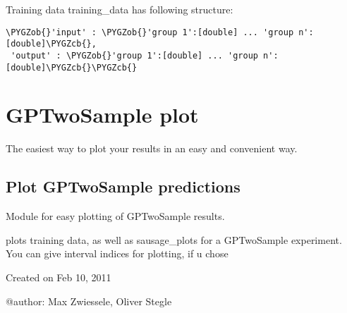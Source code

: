 \documentclass[letterpaper,10pt]{sphinxmanual}
\def\PYGZob{\char`\{}
\def\PYGZcb{\char`\}}
\begin{document}
\begin{fulllineitems}
\begin{fulllineitems}
\begin{description}
Training data training\_data has following structure:

\begin{Verbatim}[commandchars=\\\{\}]
\PYGZob{}'input' : \PYGZob{}'group 1':[double] ... 'group n':[double]\PYGZcb{},
 'output' : \PYGZob{}'group 1':[double] ... 'group n':[double]\PYGZcb{}\PYGZcb{}
\end{Verbatim}

\end{description}

\end{fulllineitems}


\end{fulllineitems}

\label{plot:module-gptwosample.plot}

\chapter{GPTwoSample plot}
\label{plot::doc}\label{plot:gptwosample-plot}
The easiest way to plot your results in an easy and convenient way.
\label{plot:module-gptwosample.plot.plot_basic}

\section{Plot GPTwoSample predictions}
\label{plot:plot-gptwosample-predictions}
Module for easy plotting of GPTwoSample results.

{\hyperref[plot:gptwosample.plot.plot_basic.plot_results]{}} plots
training data, as well as sausage\_plots for a GPTwoSample
experiment. You can give interval indices for plotting, if u chose

Created on Feb 10, 2011

@author: Max Zwiessele, Oliver Stegle
\end{document}
